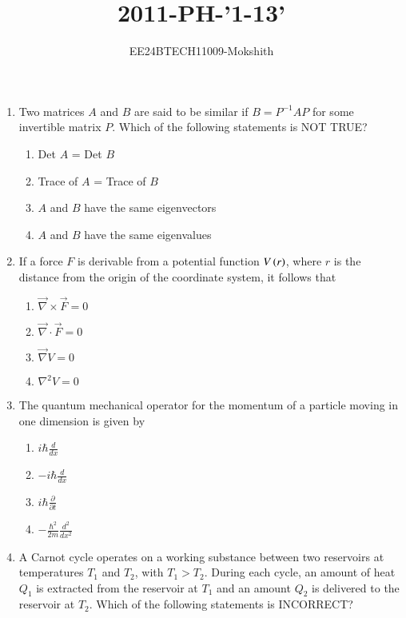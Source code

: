 \documentclass[journal]{IEEEtran}
\begin{document}

\title{2011-PH-'1-13'}
\author{EE24BTECH11009-Mokshith}
{\let\newpage\relax\maketitle}
\renewcommand{\thefigure}{\theenumi}
\renewcommand{\thetable}{\theenumi}
\setlength{\intextsep}{10pt} %
\renewcommand{\thetable}{\theenumi
}
\begin{enumerate}
\item Two matrices $A$ and $B$ are said to be similar if $B = P^{-1}AP$ for some invertible matrix $P$. Which of the following statements is NOT TRUE?
\begin{enumerate}
    \item Det $A$ = Det $B$
    \item Trace of $A$ = Trace of $B$
    \item $A$ and $B$ have the same eigenvectors
    \item $A$ and $B$ have the same eigenvalues
    \end{enumerate}
\item If a force $F$ is derivable from a potential function $V\left(r\right)$, where $r$ is the distance from the origin of the coordinate system, it follows that
\begin{enumerate}
    \item $\overrightarrow{\nabla} \times \overrightarrow{F} = 0$
    \item $\overrightarrow{\nabla} \cdot \overrightarrow{F} = 0$
    \item $\overrightarrow{\nabla} V = 0$
    \item $\nabla^2 V = 0$
\end{enumerate}
\item The quantum mechanical operator for the momentum of a particle moving in one dimension is given by
\begin{enumerate}
    \item $i\hbar\frac{d}{dx}$
    \item $-i\hbar\frac{d}{dx}$
    \item $i\hbar\frac{\partial}{\partial t}$
    \item $-\frac{\hbar^2}{2m}\frac{d^2}{dx^2}$
\end{enumerate}
\item A Carnot cycle operates on a working substance between two reservoirs at temperatures $T_1$ and $T_2$, with $T_1 > T_2$. During each cycle, an amount of heat $Q_1$ is extracted from the reservoir at $T_1$ and an amount $Q_2$ is delivered to the reservoir at $T_2$. Which of the following statements is INCORRECT?

\end{enumerate}
\end{document}
